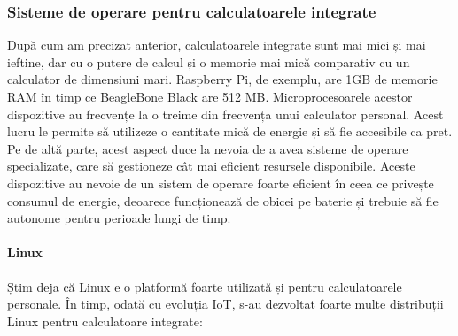 \subsubsection{Sisteme de operare pentru calculatoarele integrate}
\label{sec:embed:micro-comp:embed:os}

După cum am precizat anterior, calculatoarele integrate sunt mai mici și mai ieftine, dar cu o putere de calcul și o memorie mai mică comparativ cu un calculator de dimensiuni mari.
Raspberry Pi, de exemplu, are 1GB de memorie RAM în timp ce BeagleBone Black are 512 MB.
Microprocesoarele acestor dispozitive au frecvențe la o treime din frecvența unui calculator personal.
Acest lucru le permite să utilizeze o cantitate mică de energie și să fie accesibile ca preț.
 Pe de altă parte, acest aspect duce la nevoia de a avea sisteme de operare specializate, care să gestioneze cât mai eficient resursele disponibile.
Aceste dispozitive au nevoie de un sistem de operare foarte eficient în ceea ce privește consumul de energie, deoarece funcționează de obicei pe baterie și trebuie să fie autonome pentru perioade lungi de timp.

\paragraph{Linux}

Știm deja că Linux e o platformă foarte utilizată și pentru calculatoarele personale.
În timp, odată cu evoluția IoT, s-au dezvoltat foarte multe distribuții Linux pentru calculatoare integrate:

